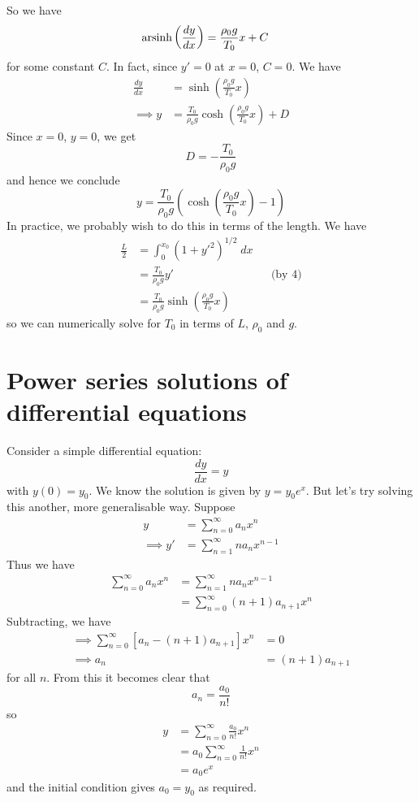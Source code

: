 \documentclass{../../template/note}
\begin{document}
    So we have
    \begin{align*}
        \operatorname{arsinh}\left(\frac{dy}{dx}\right) &= \frac{\rho_0g}{T_0}x + C
    \end{align*}
    for some constant $C$. In fact, since $y' = 0$ at $x=0$, $C = 0$. We have
    \begin{align*}
        \frac{dy}{dx} &= \sinh\left(\frac{\rho_0g}{T_0}x\right) \\
        \implies y &= \frac{T_0}{\rho_0g}\cosh\left(\frac{\rho_0g}{T_0}x\right) + D
    \end{align*}
    Since $x=0$, $y=0$, we get
    \[ 
        D = -\frac{T_0}{\rho_0g}
    \]
    and hence we conclude
    \[
        \boxed{y = \frac{T_0}{\rho_0g}\left(\cosh\left(\frac{\rho_0g}{T_0}x\right)-1\right)}
    \]
    In practice, we probably wish to do this in terms of the length. We have
    \begin{align*}
        \frac{L}{2} &= \int_0^{x_0} \left(1+y'^2\right)^{1/2} \; dx \\
        &= \frac{T_0}{\rho_0g}y' && \text{(by 4)}\\
        &= \frac{T_0}{\rho_0g}\sinh\left(\frac{\rho_0g}{T_0}x\right)
    \end{align*}
    so we can numerically solve for $T_0$ in terms of $L$, $\rho_0$ and $g$. 
    
    \section{Power series solutions of differential equations}

    Consider a simple differential equation:
    \[
        \frac{dy}{dx} = y
    \]
    with $y(0) = y_0$. We know the solution is given by $y = y_0e^x$. But let's try solving this another, more generalisable way. Suppose
    \begin{align*}
        y &= \sum_{n=0}^\infty a_n x^n \\
        \implies y' &= \sum_{n=1}^\infty na_n x^{n-1}
    \end{align*}
    Thus we have
    \begin{align*}
        \sum_{n=0}^\infty a_n x^n &= \sum_{n=1}^\infty na_n x^{n-1} \\
        &= \sum_{n=0}^\infty (n+1)a_{n+1}x^n
    \end{align*}
    Subtracting, we have
    \begin{align*}
        \implies \sum_{n=0}^\infty [a_n - (n+1)a_{n+1}]x^n &= 0 \\
        \implies a_n &= (n+1)a_{n+1}
    \end{align*}
    for all $n$. From this it becomes clear that
    \[
        a_n = \frac{a_0}{n!}
    \]
    so
    \begin{align*}
        y &= \sum_{n=0}^\infty \frac{a_0}{n!} x^n \\
        &= a_0 \sum_{n=0}^\infty \frac{1}{n!} x^n \\
        &= a_0 e^x
    \end{align*}
    and the initial condition gives $a_0 = y_0$ as required.
    
    
    
    
\end{document}
